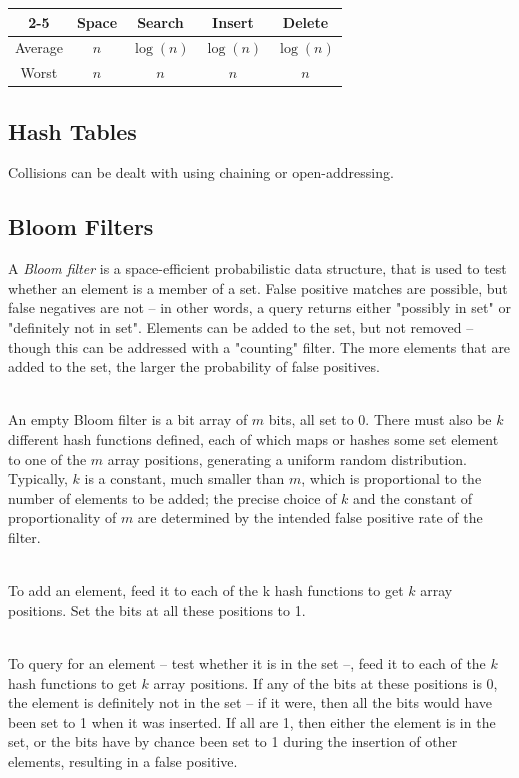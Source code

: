 \documentclass[a4paper, 12pt]{article}
\begin{document}
\begin{center}	
\begin{tabular}{| c | c | c | c | c |}
\cline{2-5}
\multicolumn{1}{c |}{} & Space & Search & Insert & Delete \\
\hline
Average & $n$ & $\log(n)$ & $\log(n)$ & $\log(n)$ \\
\hline
Worst & $n$ & $n$ & $n$ & $n$ \\
\hline
\end{tabular}
\end{center}
	
	\subsection{Hash Tables}

Collisions can be dealt with using chaining or open-addressing.

  \subsection{Bloom Filters}

A \textit{Bloom filter} is a space-efficient probabilistic data structure, that is used to test whether an element is a member of a set. False positive matches are possible, but false negatives are not -- in other words, a query returns either "possibly in set" or "definitely not in set". Elements can be added to the set, but not removed -- though this can be addressed with a "counting" filter. The more elements that are added to the set, the larger the probability of false positives.

~\\
An empty Bloom filter is a bit array of $m$ bits, all set to 0. There must also be $k$ different hash functions defined, each of which maps or hashes some set element to one of the $m$ array positions, generating a uniform random distribution. Typically, $k$ is a constant, much smaller than $m$, which is proportional to the number of elements to be added; the precise choice of $k$ and the constant of proportionality of $m$ are determined by the intended false positive rate of the filter.

~\\
To add an element, feed it to each of the k hash functions to get $k$ array positions. Set the bits at all these positions to 1.

~\\
To query for an element -- test whether it is in the set --, feed it to each of the $k$ hash functions to get $k$ array positions. If any of the bits at these positions is 0, the element is definitely not in the set – if it were, then all the bits would have been set to 1 when it was inserted. If all are 1, then either the element is in the set, or the bits have by chance been set to 1 during the insertion of other elements, resulting in a false positive.
\end{document}
